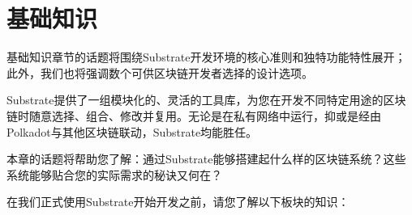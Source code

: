 \chapter{基础知识}

基础知识章节的话题将围绕Substrate开发环境的核心准则和独特功能特性展开；此外，我们也将强调数个可供区块链开发者选择的设计选项。

Substrate提供了一组模块化的、灵活的工具库，为您在开发不同特定用途的区块链时随意选择、组合、修改并复用。无论是在私有网络中运行，抑或是经由Polkadot与其他区块链联动，Substrate均能胜任。

本章的话题将帮助您了解：通过Substrate能够搭建起什么样的区块链系统？这些系统能够贴合您的实际需求的秘诀又何在？


在我们正式使用Substrate开始开发之前，请您了解以下板块的知识：

